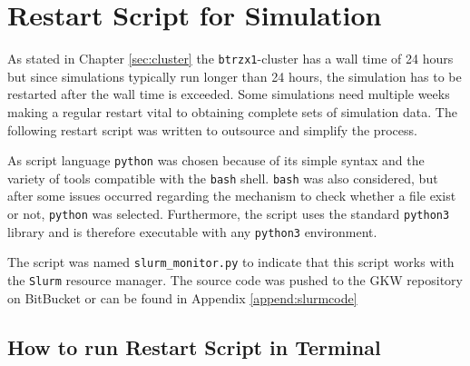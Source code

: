 \section{Restart Script for Simulation}
\label{sec:restartscript}

As stated in Chapter \ref{sec:cluster} the \texttt{btrzx1}-cluster has a wall time of 24 hours but since simulations typically run longer than 24 hours, the simulation has to be restarted after the wall time is exceeded. Some simulations need multiple weeks making a regular restart vital to obtaining complete sets of simulation data. The following restart script was written to outsource and simplify the process.

As script language \texttt{python} was chosen because of its simple syntax and the variety of tools compatible with the \texttt{bash} shell. \texttt{bash} was also considered, but after some issues occurred regarding the mechanism to check whether a file exist or not, \texttt{python} was selected. Furthermore, the script uses the standard \texttt{python3} library and is therefore executable with any \texttt{python3} environment.

The script was named \texttt{slurm\_monitor.py} to indicate that this script works with the \texttt{Slurm} resource manager. The source code was pushed to the GKW repository on BitBucket \cite{slurmmonitor} or can be found in Appendix \ref{append:slurmcode}

\subsection{How to run Restart Script in Terminal}
\label{sub:codeRun}

